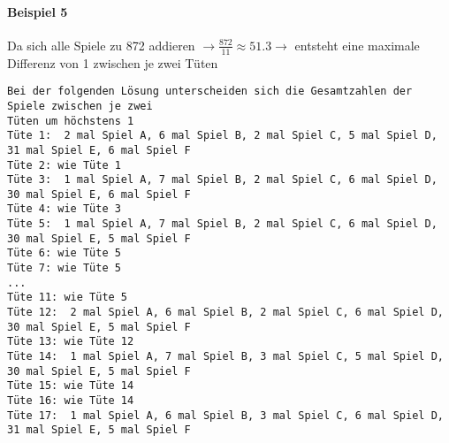 \documentclass[a4paper,10pt,ngerman]{scrartcl}
\begin{document}
\paragraph{Beispiel 5}
Da sich alle Spiele zu 872 addieren $\rightarrow \frac{872}{11}\approx51.3 \rightarrow$ entsteht eine maximale Differenz von 1 zwischen je zwei Tüten
\begin{lstlisting}[frame=tb,breaklines=true]
Bei der folgenden Lösung unterscheiden sich die Gesamtzahlen der Spiele zwischen je zwei 
Tüten um höchstens 1
Tüte 1:  2 mal Spiel A, 6 mal Spiel B, 2 mal Spiel C, 5 mal Spiel D, 31 mal Spiel E, 6 mal Spiel F
Tüte 2: wie Tüte 1
Tüte 3:  1 mal Spiel A, 7 mal Spiel B, 2 mal Spiel C, 6 mal Spiel D, 30 mal Spiel E, 6 mal Spiel F
Tüte 4: wie Tüte 3
Tüte 5:  1 mal Spiel A, 7 mal Spiel B, 2 mal Spiel C, 6 mal Spiel D, 30 mal Spiel E, 5 mal Spiel F
Tüte 6: wie Tüte 5
Tüte 7: wie Tüte 5
...
Tüte 11: wie Tüte 5
Tüte 12:  2 mal Spiel A, 6 mal Spiel B, 2 mal Spiel C, 6 mal Spiel D, 30 mal Spiel E, 5 mal Spiel F
Tüte 13: wie Tüte 12
Tüte 14:  1 mal Spiel A, 7 mal Spiel B, 3 mal Spiel C, 5 mal Spiel D, 30 mal Spiel E, 5 mal Spiel F
Tüte 15: wie Tüte 14
Tüte 16: wie Tüte 14
Tüte 17:  1 mal Spiel A, 6 mal Spiel B, 3 mal Spiel C, 6 mal Spiel D, 31 mal Spiel E, 5 mal Spiel F
\end{lstlisting}
\end{document}
